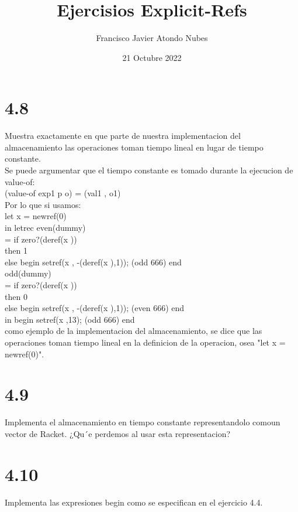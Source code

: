 \documentclass{article}
\title{Ejercisios Explicit-Refs}
\author{Francisco Javier Atondo Nubes }
\date{21 Octubre 2022}
\begin{document}
\begin{tab}

\maketitle

\section{4.8}
\noindent Muestra exactamente en que parte de nuestra implementacion del almacenamiento las operaciones toman tiempo lineal en lugar de tiempo constante.\\

\noindent Se puede argumentar que el tiempo constante es tomado durante la ejecucion de value-of:\\
 (value-of exp1 p o) = (val1 , o1)\\

Por lo que si usamos:\\
\- \> let x = newref(0)\\
\- \> in letrec even(dummy)\\
\- \> \> = if zero?(deref(x ))\\
\- \> \> \> then 1\\
\- \> \> \>else begin setref(x , -(deref(x ),1)); (odd 666) end\\
\- \> \> odd(dummy)\\
\- \> \> = if zero?(deref(x ))\\
\- \> \> \> then 0\\
\- \> \> \> else begin setref(x , -(deref(x ),1)); (even 666) end\\
\- \> in begin setref(x ,13); (odd 666) end\\

\noindent como ejemplo de la implementacion del almacenamiento, se dice que las operaciones toman tiempo lineal en la definicion de la operacion, osea "let x = newref(0)".\\

\section{4.9}
Implementa el almacenamiento en tiempo constante representandolo comoun vector de Racket. ¿Qu´e perdemos al usar esta representacion?

\section{4.10}
Implementa las expresiones begin como se especifican en el ejercicio 4.4.


\end{tab}
\end{document}
